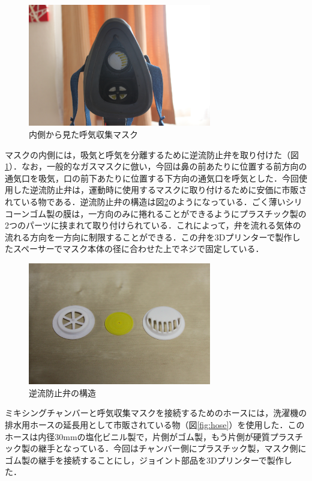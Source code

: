 \begin{figure}[H]
  \begin{center}
    \includegraphics[width=8cm]{fig/mask_rear}
    \caption{内側から見た呼気収集マスク}
    \label{fig:mask_rear}
  \end{center}
\end{figure}

マスクの内側には，吸気と呼気を分離するために逆流防止弁を取り付けた（図\ref{fig:mask_rear}）．なお，一般的なガスマスクに倣い，今回は鼻の前あたりに位置する前方向の通気口を吸気，口の前下あたりに位置する下方向の通気口を呼気とした．今回使用した逆流防止弁は，運動時に使用するマスクに取り付けるために安価に市販されている物である．逆流防止弁の構造は図\ref{fig:bulb}のようになっている．ごく薄いシリコーンゴム製の膜は，一方向のみに捲れることができるようにプラスチック製の2つのパーツに挟まれて取り付けられている．これによって，弁を流れる気体の流れる方向を一方向に制限することができる．この弁を3Dプリンターで製作したスペーサーでマスク本体の径に合わせた上でネジで固定している．

\begin{figure}[H]
  \begin{center}
    \includegraphics[width=8cm]{fig/bulb}
    \caption{逆流防止弁の構造}
    \label{fig:bulb}
  \end{center}
\end{figure}

ミキシングチャンバーと呼気収集マスクを接続するためのホースには，洗濯機の排水用ホースの延長用として市販されている物（図\ref{fig:hose}）を使用した．このホースは内径30mmの塩化ビニル製で，片側がゴム製，もう片側が硬質プラスチック製の継手となっている．今回はチャンバー側にプラスチック製，マスク側にゴム製の継手を接続することにし，ジョイント部品を3Dプリンターで製作した．

